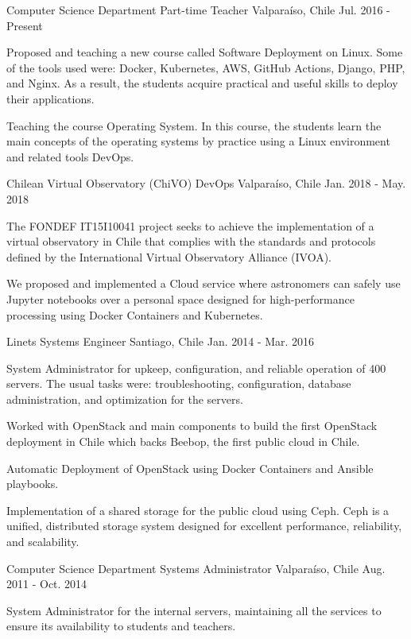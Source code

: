 \begin{cventries}
  \cventry
    {Computer Science Department}
    {Part-time Teacher}
    {Valparaíso, Chile}
    {Jul. 2016 - Present}
    {
      \begin{cvitems}
        \item {Proposed and teaching a new course called Software Deployment on Linux. Some of the tools used were: Docker, Kubernetes, AWS, GitHub Actions, Django, PHP, and Nginx. As a result, the students acquire practical and useful skills to deploy their applications.}
        \item {Teaching the course Operating System. In this course, the students learn the main concepts of the operating systems by practice using a Linux environment and related tools DevOps.}
      \end{cvitems}
    }


  \cventry
    {Chilean Virtual Observatory (ChiVO)}
    {DevOps}
    {Valparaíso, Chile}
    {Jan. 2018 - May. 2018}
    {
      \begin{cvitems}
        \item {The FONDEF IT15I10041 project seeks to achieve the implementation of a virtual observatory in Chile that complies with the standards and protocols defined by the International Virtual Observatory Alliance (IVOA).}
        \item {We proposed and implemented a Cloud service where astronomers can safely use Jupyter notebooks over a personal space designed for high-performance processing using Docker Containers and Kubernetes.}
      \end{cvitems}
    }


  \cventry
    {Linets}
    {Systems Engineer}
    {Santiago, Chile}
    {Jan. 2014 - Mar. 2016}
    {
      \begin{cvitems}
        \item {System Administrator for upkeep, configuration, and reliable operation of 400 servers. The usual tasks were: troubleshooting, configuration, database administration, and optimization for the servers.}
        \item {Worked with OpenStack and main components to build the first OpenStack deployment in Chile which backs Beebop, the first public cloud in Chile.}
        \item {Automatic Deployment of OpenStack using Docker Containers and Ansible playbooks.}
        \item {Implementation of a shared storage for the public cloud using Ceph. Ceph is a unified, distributed storage system designed for excellent performance, reliability, and scalability.}
      \end{cvitems}
    }

  \cventry
    {Computer Science Department}
    {Systems Administrator}
    {Valparaíso, Chile}
    {Aug. 2011 - Oct. 2014}
    {
      \begin{cvitems}
		\item{System Administrator for the internal servers, maintaining all the services to ensure its availability to students and teachers.}
      \end{cvitems}
    }
\end{cventries}
